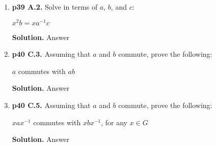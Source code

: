 \documentclass[11pt]{article}
\begin{document}
\begin{enumerate}
  {\bfseries Solution.}
  Answer
 
\item {\bfseries p39 A.2.}
  Solve in terms of $a$, $b$, and $c$:
  
  $x^2b = xa^{-1}c$
  
  {\bfseries Solution.}
  Answer
 
\item {\bfseries p40 C.3.}
  Assuming that $a$ and $b$ commute, prove the following:
  
  $a$ commutes with $ab$
  
  {\bfseries Solution.}
  Answer
 
\item {\bfseries p40 C.5.}
  Assuming that $a$ and $b$ commute, prove the following:
  
  $xax^{-1}$ commutes with $xbx^{-1}$, for any $x \in G$
  
  {\bfseries Solution.}
  Answer


\end{enumerate}
\end{document}
